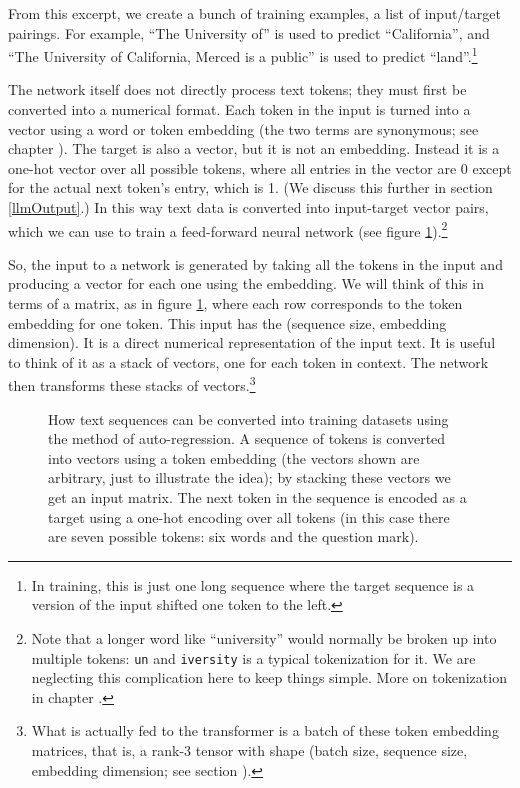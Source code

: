 From this excerpt, we create a bunch of training examples, a list of
input/target pairings. For example, ``The University of'' is used to predict ``California'', and ``The University of California, Merced is a public'' is used to predict ``land''.\footnote{In training, this is just one long sequence where the target
sequence is a version of the input shifted one token to the left.}

The network itself does not directly process text tokens; they must first be converted into a numerical format. Each token in the input is turned into a vector using a word or token embedding (the two terms are synonymous; see chapter ). The target is also
a vector, but it is not an embedding. Instead it is a
one-hot vector over all possible tokens, where all entries in the
vector are 0 except for the actual next token's entry, which is 1. (We discuss
this further in section \ref{llmOutput}.) In this way text data is converted into input-target vector pairs, which we can use to train a feed-forward neural network (see figure
\ref{nextWordPrediction}).\footnote{Note that a longer word like ``university''
would normally be broken up into multiple tokens: \texttt{un} and
\texttt{iversity} is a typical tokenization for it. We are neglecting this
complication here to keep things simple. More on tokenization in chapter
.}  

So, the input to a network is generated by taking all the tokens in the input and producing a vector for each one using the embedding. We will think of this in terms of a matrix, as in figure \ref{nextWordPrediction}, where each row corresponds
to the token embedding for one token. This input has the  (sequence size,
embedding dimension). It is a direct numerical representation of the input text. It is useful to think of it as a stack of vectors, one for each token in context. The network then transforms these stacks of vectors.\footnote{What is actually fed to the transformer is a batch of these
token embedding matrices, that is, a rank-3 tensor with shape (batch size,
sequence size, embedding dimension; see section ).}

\begin{figure}[ht]
\centering
{}
\caption[Jeff Yoshimi.]{How text sequences can be converted into training
datasets using the method of auto-regression. A sequence of tokens is converted into
vectors using a token embedding (the vectors shown are arbitrary, just to
illustrate the idea); by stacking these vectors we get an input matrix.
The next token in the sequence is encoded as a target using a one-hot encoding
over all tokens (in this case there are seven possible tokens: six words and
the question mark).}
\label{nextWordPrediction}
\end{figure}


